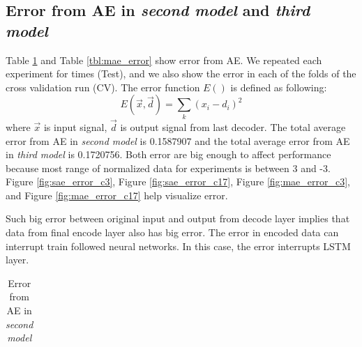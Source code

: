 \documentclass[draft,dvipsnames]{drexel-thesis}
\begin{document}
\begin{thesis}

\subsection{Error from AE in {\em second model} and {\em third model}}
Table \ref{tbl:sae_error} and Table \ref{tbl:mae_error} show error from AE. We repeated each experiment for times (Test), and we also show the error in each of the folds of the cross validation run (CV). The error function $E()$ is defined as following:
$$E(\vec{x}, \vec{d})=\sum_k(x_i-d_i)^2$$
where $\vec{x}$ is input signal, $\vec{d}$ is output signal from last decoder. The total average error from AE in {\em second model} is 0.1587907 and the total average error from AE in {\em third model} is 0.1720756. Both error are big enough to affect performance because most range of normalized data for experiments is between 3 and -3. Figure \ref{fig:sae_error_c3}, Figure \ref{fig:sae_error_c17}, Figure \ref{fig:mae_error_c3}, and Figure \ref{fig:mae_error_c17} help visualize error.

Such big error between original input and output from decode layer implies that data from final encode layer also has big error. The error in encoded data can interrupt train followed neural networks. In this case, the error interrupts LSTM layer.


\begin{table}[!t]
\centering
\caption{Error from AE in {\em second model}}
\label{tbl:sae_error}
\begin{tabular}{|c|c|c|c|c|c|c|}
\hline


\end{tabular}
\end{table}
\end{thesis}
\end{document}
